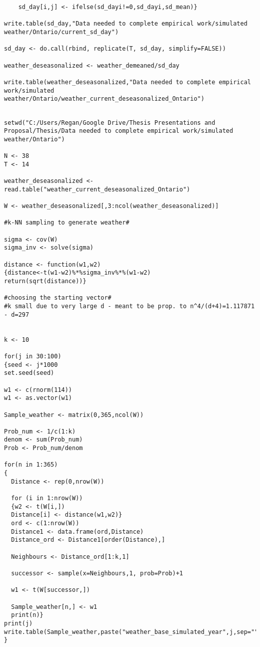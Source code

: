 \begin{lstlisting}
    sd_day[i,j] <- ifelse(sd_dayi!=0,sd_dayi,sd_mean)}

write.table(sd_day,"Data needed to complete empirical work/simulated weather/Ontario/current_sd_day")

sd_day <- do.call(rbind, replicate(T, sd_day, simplify=FALSE))

weather_deseasonalized <- weather_demeaned/sd_day

write.table(weather_deseasonalized,"Data needed to complete empirical work/simulated weather/Ontario/weather_current_deseasonalized_Ontario")


\end{lstlisting}

\begin{lstlisting}
setwd("C:/Users/Regan/Google Drive/Thesis Presentations and Proposal/Thesis/Data needed to complete empirical work/simulated weather/Ontario")

N <- 38
T <- 14

weather_deseasonalized <- read.table("weather_current_deseasonalized_Ontario")

W <- weather_deseasonalized[,3:ncol(weather_deseasonalized)]

#k-NN sampling to generate weather#

sigma <- cov(W)
sigma_inv <- solve(sigma)

distance <- function(w1,w2)
{distance<-t(w1-w2)%*%sigma_inv%*%(w1-w2)
return(sqrt(distance))}

#choosing the starting vector#
#k small due to very large d - meant to be prop. to n^4/(d+4)=1.117871 - d=297


k <- 10

for(j in 30:100)
{seed <- j*1000
set.seed(seed)

w1 <- c(rnorm(114))
w1 <- as.vector(w1)

Sample_weather <- matrix(0,365,ncol(W))

Prob_num <- 1/c(1:k)
denom <- sum(Prob_num)
Prob <- Prob_num/denom

for(n in 1:365)
{
  Distance <- rep(0,nrow(W))
  
  for (i in 1:nrow(W))
  {w2 <- t(W[i,])
  Distance[i] <- distance(w1,w2)}
  ord <- c(1:nrow(W))
  Distance1 <- data.frame(ord,Distance)
  Distance_ord <- Distance1[order(Distance),]
  
  Neighbours <- Distance_ord[1:k,1]
  
  successor <- sample(x=Neighbours,1, prob=Prob)+1
  
  w1 <- t(W[successor,]) 
  
  Sample_weather[n,] <- w1
  print(n)}
print(j)
write.table(Sample_weather,paste("weather_base_simulated_year",j,sep=""))
}
\end{lstlisting}

